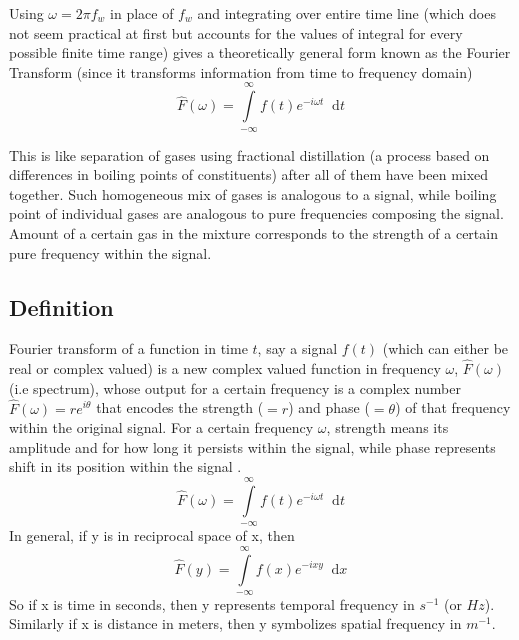 \documentclass[11pt, a4paper]{article}
\newcommand{\diff}{\mathop{}\!\mathrm{d}}
\newcommand{\dx}{\diff x}
\newcommand{\dt}{\diff t}
\newcommand{\dint}[2]{\int \limits_{#1}^{#2}}  %
\newcommand{\intinfty}{\dint{-\infty}{\infty}}	%
\begin{document}
	Using $\omega = 2\pi f_{w}$ in place of $f_{w}$ and integrating over entire time line (which does not seem practical at first but accounts for the values of integral for every possible finite time range) gives a theoretically general form known as the Fourier Transform (since it transforms information from time to frequency domain)
	\begin{equation}\label{eq:com.wrapped_signal.FT_final}
		\hat{F}(\omega) = \intinfty f(t)e^{-i\omega t} \dt
	\end{equation}
	
	This is like separation of gases using fractional distillation (a process based on differences in boiling points of constituents) after all of them have been mixed together. Such homogeneous mix of gases is analogous to a signal, while boiling point of individual gases are analogous to pure frequencies composing the signal. Amount of a certain gas in the mixture corresponds to the strength of a certain pure frequency within the signal. 
	
	\subsection{Definition}\label{sec:fourier_transform_def}  %
	
	
	Fourier transform of a function in time $t$, say a signal $f(t)$ (which can either be real or complex valued) is a new complex valued function in frequency $\omega$, $\hat{F}(\omega)$ (i.e spectrum), whose output for a certain frequency is a complex number $\hat{F}(\omega)=re^{i\theta}$ that encodes the strength ($=r$) and phase ($=\theta$) of that frequency within the original signal. For a certain frequency $\omega$, strength means its amplitude and for how long it persists within the signal, while phase represents shift in its position within the signal \cite{herman2016fourieranalysis}.
	\begin{equation}\label{eq:ft_def}
		\boxed{
			\hat{F}(\omega) = \intinfty f(t)e^{-i\omega t} \dt
		}
	\end{equation}
	In general, if y is in reciprocal space of x, then
	\begin{equation*}\label{eq:ft_def_general}
		\hat{F}(y) = \intinfty f(x)e^{-ixy} \dx
	\end{equation*}
	So if x is time in seconds, then y represents temporal frequency in $s^{-1}$ (or $Hz$). Similarly if x is distance in meters, then y symbolizes spatial frequency in $m^{-1}$.
	
\end{document}
